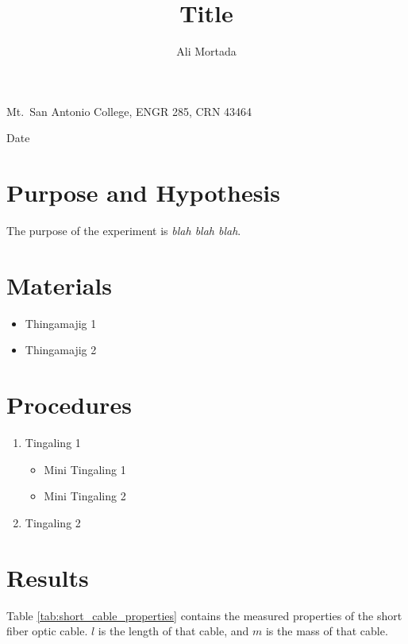 \documentclass[12pt]{iopart} %
\begin{document}
\title{Title}
\author{Ali Mortada}
\vspace{10pt}
\begin{indented}
  \item[]Mt.~San Antonio College, ENGR 285, CRN 43464
  \item[]Date
\end{indented}
\newpage

\section{Purpose and Hypothesis}

The purpose of the experiment is \emph{blah blah blah}.

\section{Materials}

\begin{itemize}
\item
  Thingamajig 1
\item
  Thingamajig 2
\end{itemize}

\section{Procedures}

\begin{enumerate}
\def\labelenumi{\arabic{enumi}.}
\item
  Tingaling 1

  \begin{itemize}
    \item
      Mini Tingaling 1
    \item
      Mini Tingaling 2
  \end{itemize}
\item
  Tingaling 2
\end{enumerate}

\section{Results}

Table \ref{tab:short_cable_properties} contains the measured properties of the short fiber optic cable.
$l$ is the length of that cable, and $m$ is the mass of that cable.
\end{document}
